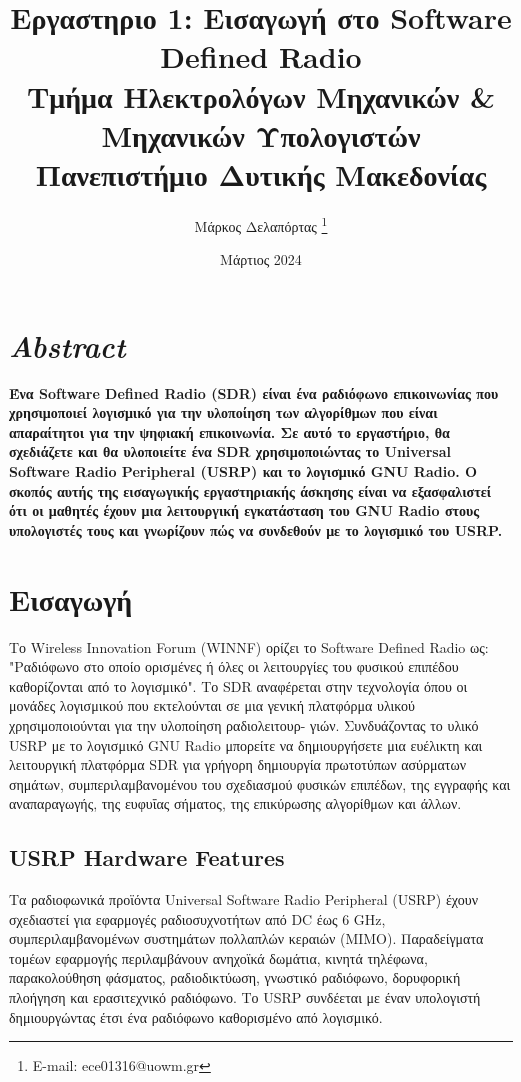 \documentclass[12pt]{report}
\title{\textsf{Εργαστηριο 1: Εισαγωγή στο Software Defined Radio\\
    \large Τμήμα Ηλεκτρολόγων Μηχανικών \& Μηχανικών Υπολογιστών \\
    Πανεπιστήμιο Δυτικής Μακεδονίας
}}
\author{\textsf{Μάρκος Δελαπόρτας} \footnote{E-mail: ece01316@uowm.gr}}
\date{\textsf{Mάρτιος 2024}}
\begin{document}
    \maketitle

    \section*{\textsf{\textit{Abstract}}}\textbf{
        Ένα Software Defined Radio (SDR) είναι ένα ραδιόφωνο επικοινωνίας
        που χρησιμοποιεί λογισμικό για την υλοποίηση των αλγορίθμων που
        είναι απαραίτητοι για την ψηφιακή επικοινωνία.
        Σε αυτό το εργαστήριο, θα σχεδιάζετε και θα υλοποιείτε ένα SDR
        χρησιμοποιώντας το Universal Software Radio Peripheral (USRP)
        και το λογισμικό GNU Radio.
        Ο σκοπός αυτής της εισαγωγικής εργαστηριακής άσκησης είναι να
        εξασφαλιστεί ότι οι μαθητές έχουν μια λειτουργική εγκατάσταση του
        GNU Radio στους υπολογιστές τους και γνωρίζουν πώς να συνδεθούν
        με το λογισμικό του USRP.}

    \section{\textsf{Εισαγωγή}}
        Το Wireless Innovation Forum (WINNF) ορίζει το Software Defined Radio
        ως: "Ραδιόφωνο στο οποίο ορισμένες ή όλες οι λειτουργίες του φυσικού
        επιπέδου καθορίζονται από το λογισμικό". Το SDR αναφέρεται στην
        τεχνολογία όπου οι μονάδες λογισμικού που εκτελούνται σε μια γενική
        πλατφόρμα υλικού χρησιμοποιούνται για την υλοποίηση ραδιολειτουρ- γιών.
        Συνδυάζοντας το υλικό USRP με το λογισμικό GNU Radio μπορείτε να
        δημιουργήσετε μια ευέλικτη και λειτουργική πλατφόρμα SDR για γρήγορη
        δημιουργία πρωτοτύπων ασύρματων σημάτων, συμπεριλαμβανομένου του
        σχεδιασμού φυσικών επιπέδων, της εγγραφής και αναπαραγωγής, της
        ευφυΐας σήματος, της επικύρωσης αλγορίθμων και άλλων.

        \subsection{\textsf{USRP Hardware Features}}
            Τα ραδιοφωνικά προϊόντα Universal Software Radio Peripheral (USRP)
            έχουν σχεδιαστεί για εφαρμογές ραδιοσυχνοτήτων από DC έως 6 GHz,
            συμπεριλαμβανομένων συστημάτων πολλαπλών κεραιών (MIMO).
            Παραδείγματα τομέων εφαρμογής περιλαμβάνουν ανηχοϊκά δωμάτια, 
            κινητά τηλέφωνα, παρακολούθηση φάσματος, ραδιοδικτύωση, γνωστικό
            ραδιόφωνο, δορυφορική πλοήγηση και ερασιτεχνικό ραδιόφωνο. 
            Το USRP συνδέεται με έναν υπολογιστή δημιουργώντας έτσι ένα 
            ραδιόφωνο καθορισμένο από λογισμικό.
\end{document}

